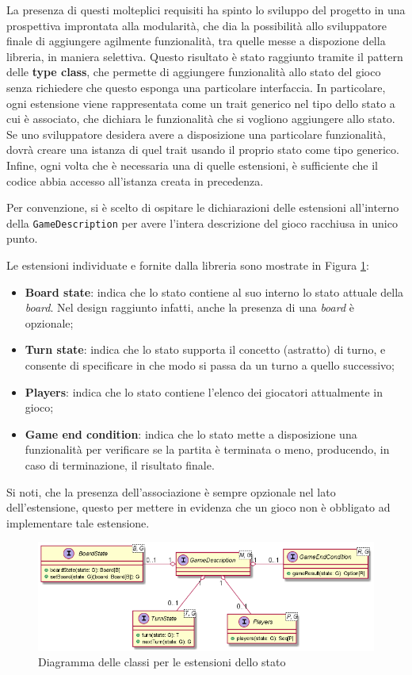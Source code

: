 La presenza di questi molteplici requisiti ha spinto lo sviluppo del progetto in una prospettiva improntata alla modularità, che dia la possibilità allo sviluppatore finale di aggiungere agilmente funzionalità, tra quelle messe a dispozione della libreria, in maniera selettiva.
%
Questo risultato è stato raggiunto tramite il pattern delle \textbf{type class}, che permette di aggiungere funzionalità allo stato del gioco senza richiedere che questo esponga una particolare interfaccia.
%
In particolare, ogni estensione viene rappresentata come un trait generico nel tipo dello stato a cui è associato, che dichiara le funzionalità che si vogliono aggiungere allo stato.
%
Se uno sviluppatore desidera avere a disposizione una particolare funzionalità, dovrà creare una istanza di quel trait usando il proprio stato come tipo generico.
%
Infine, ogni volta che è necessaria una di quelle estensioni, è sufficiente che il codice abbia accesso all'istanza creata in precedenza.

Per convenzione, si è scelto di ospitare le dichiarazioni delle estensioni all'interno della \texttt{GameDescription} per avere l'intera descrizione del gioco racchiusa in unico punto.

Le estensioni individuate e fornite dalla libreria sono mostrate in Figura \ref{fig:extensions}:
%
\begin{itemize}
    \item \textbf{Board state}: indica che lo stato contiene al suo interno lo stato attuale della \textit{board}.
    Nel design raggiunto infatti, anche la presenza di una \textit{board} è opzionale;
    \item \textbf{Turn state}: indica che lo stato supporta il concetto (astratto) di turno, e consente di specificare in che modo si passa da un turno a quello successivo;
    \item \textbf{Players}: indica che lo stato contiene l'elenco dei giocatori attualmente in gioco;
    \item \textbf{Game end condition}: indica che lo stato mette a disposizione una funzionalità per verificare se la partita è terminata o meno, producendo, in caso di terminazione, il risultato finale.
\end{itemize}
%
Si noti, che la presenza dell'associazione è sempre opzionale nel lato dell'estensione, questo per mettere in evidenza che un gioco non è obbligato ad implementare tale estensione.
%
\begin{figure}
    \centering
    \includegraphics[width=\linewidth]{images/uml/extensions.png}
    \caption{Diagramma delle classi per le estensioni dello stato}
    \label{fig:extensions}
\end{figure}

